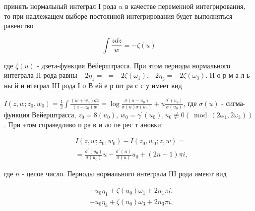 \documentclass[10pt]{article}
\begin{document}
принять нормальный интеграл I рода $u$ в качестве переменной интегрирования, то при надлежащем выборе постоянной интегрирования будет выполняться равенство



\[

\int \frac{z d z}{w}=-\zeta(u)

\]



где $\zeta(u)$ - дзета-функция Вейерштрасса. При этом периоды нормального интеграла II рода равны $-2 \eta_{1}=$ $=-2 \zeta\left(\omega_{1}\right),-2 \eta_{3}=-2 \zeta\left(\omega_{3}\right)$. Н о р м а л ь ны й и нтеграл III рода I о В ей е р шт ра с с у имеет вид



$I\left(z, w ; z_{0}, w_{0}\right)=\frac{1}{2} \int \frac{\left(w+w_{0}\right) d z}{\left(z-z_{0}\right) w}=\log \frac{\sigma\left(u-u_{0}\right)}{\sigma(u) \sigma\left(u_{0}\right)}+u \frac{\sigma^{\prime}\left(u_{v}\right)}{\sigma\left(u_{0}\right)}$, где $\sigma(u)$ - сигма-функция Вейерштрасса, $z_{0}=8\left(u_{0}\right)$, $w_{0}=\gamma^{\prime}\left(u_{0}\right), u_{0} \not \equiv 0\left(\bmod \left(2 \omega_{1}, 2 \omega_{3}\right)\right)$. При этом справедливо п ра в и ло пе рес т ановки:



\[

\begin{aligned}

& I\left(z, w ; z_{0}, w_{0}\right)-I\left(z_{0}, w_{0} ; z, w\right)= \\

& =\frac{\sigma^{\prime}\left(u_{0}\right)}{\sigma\left(u_{0}\right)} u-\frac{\sigma^{\prime}(u)}{\sigma(u)} u_{0}+(2 n+1) \pi i,

\end{aligned}

\]



где $n$ - целое число. Периоды нормального интеграла III рода имеют вид



\[

\begin{aligned}

& -u_{0} \eta_{1}+\zeta\left(u_{0}\right) \omega_{1}+2 n_{1} \pi i ; \\

& -u_{0} \eta_{3}+\zeta\left(u_{0}\right) \omega_{3}+2 n_{3} \pi i,

\end{aligned}

\]
\end{document}
